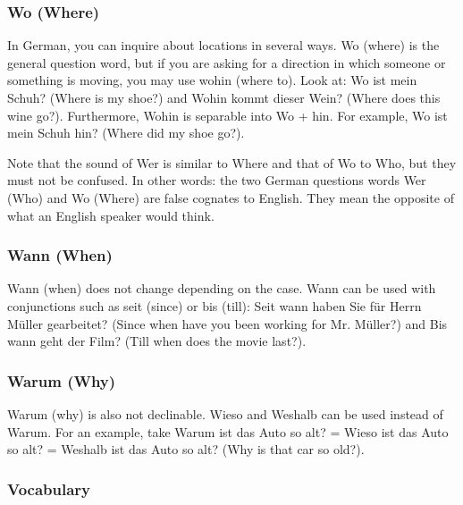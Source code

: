 \subsubsection{Wo (Where)}

In German, you can inquire about locations in several ways. Wo (where) is the general question word, but if you are asking for a direction in which someone or something is moving, you may use wohin (where to). Look at: Wo ist mein Schuh? (Where is my shoe?) and Wohin kommt dieser Wein? (Where does this wine go?). Furthermore, Wohin is separable into Wo + hin. For example, Wo ist mein Schuh hin? (Where did my shoe go?).

Note that the sound of Wer is similar to Where and that of Wo to Who, but they must not be confused. In other words: the two German questions words Wer (Who) and Wo (Where) are false cognates to English. They mean the opposite of what an English speaker would think.

\subsubsection{Wann (When)}

Wann (when) does not change depending on the case. Wann can be used with conjunctions such as seit (since) or bis (till): Seit wann haben Sie für Herrn Müller gearbeitet? (Since when have you been working for Mr. Müller?) and Bis wann geht der Film? (Till when does the movie last?).

\subsubsection{Warum (Why)}

Warum (why) is also not declinable. Wieso and Weshalb can be used instead of Warum. For an example, take Warum ist das Auto so alt? = Wieso ist das Auto so alt? = Weshalb ist das Auto so alt? (Why is that car so old?).

\subsubsection{Vocabulary}

